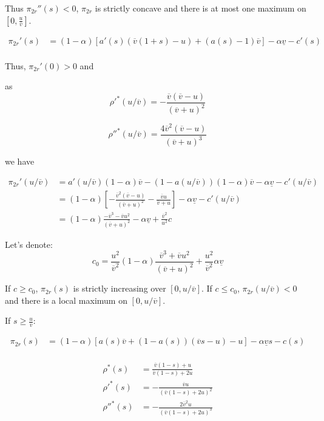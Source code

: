 \documentclass[a4paper,leqno]{article}%
\renewcommand{\a}{\alpha}
\newcommand{\uv}{\underline{v}}
\newcommand{\ov}{\overline{v}}
\begin{document}
Thus $\pi_{2r}''(s)<0$, $\pi_{2r}$ is strictly concave and there is at most one maximum on $[0,\frac{u}{\ov}]$. 

\begin{equation}
    \begin{aligned}
\pi_{2r}'(s)&=(1-\a)[a'(s)(\ov(1+s)-u)+(a(s)-1)\ov]-\a \uv-c'(s)\\
\end{aligned}
\end{equation}

Thus, $\pi_{2r}'(0)>0$ and 

as $$\rho'^{*}(u/\ov)=-\frac{\ov(\ov-u)}{(\ov+u)^2}$$

$$\rho''^{*}(u/\ov)=\frac{4\ov^2(\ov-u)}{(\ov+u)^3}$$

we have

\begin{equation}
    \begin{aligned}
\pi_{2r}'(u/\ov)&=a'(u/\ov)(1-\a)\ov-(1-a(u/\ov))(1-\a)\ov-\a\uv-c'(u/\ov)\\
                &=(1-\a)[-\frac{\ov^2(\ov-u)}{(\ov+u)^2}-\frac{\ov u}{\ov+u}]-\a \uv-c'(u/\ov)\\
                &= (1-\a)\frac{-\ov^3-\ov u^2}{(\ov+u)^2}-\a \uv+\frac{\ov^2}{u^2}c
    \end{aligned}
\end{equation}

Let's denote: $$c_0=\frac{u^2}{\ov^2}(1-\a)\frac{\ov^3+\ov u^2}{(\ov+u)^2}+\frac{u^2}{\ov^2}\a \uv$$

If $c\geq c_0$, $\pi_{2r}(s)$ is strictly increasing over $[0,u/\ov]$. If $c\leq c_0$, $\pi_{2r}(u/\ov)<0$ and there is a local maximum on $[0,u/\ov]$. 

\bigskip

If $s\geq\frac{u}{\ov}$:

\begin{equation}
    \begin{aligned}
\pi_{2r}(s)&=(1-\a)[a(s)\ov+(1-a(s))(\ov s-u)-u]-\a\uv s-c(s)\\
    \end{aligned}
\end{equation}



\begin{equation}
    \begin{aligned}
\rho^*(s)&=\frac{\ov(1-s)+u}{\ov(1-s)+2u}\\
\rho'^{*}(s)&=-\frac{\ov u}{(\ov(1-s)+2u)^2}\\
\rho''^{*}(s)&=-\frac{2\ov^2u}{(\ov(1-s)+2u)^3}
    \end{aligned}
\end{equation}
\end{document}

